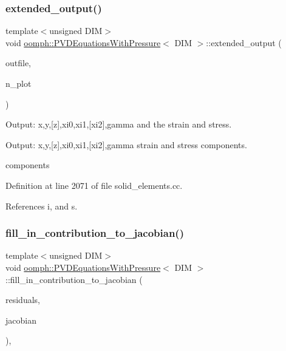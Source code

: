 \subsubsection{\texorpdfstring{extended\+\_\+output()}{extended\_output()}}
{\footnotesize\ttfamily template$<$unsigned D\+IM$>$ \\
void \hyperlink{classoomph_1_1PVDEquationsWithPressure}{oomph\+::\+P\+V\+D\+Equations\+With\+Pressure}$<$ D\+IM $>$\+::extended\+\_\+output (\begin{DoxyParamCaption}\item[{std\+::ostream \&}]{outfile,  }\item[{const unsigned \&}]{n\+\_\+plot }\end{DoxyParamCaption})}



Output\+: x,y,\mbox{[}z\mbox{]},xi0,xi1,\mbox{[}xi2\mbox{]},gamma and the strain and stress. 

Output\+: x,y,\mbox{[}z\mbox{]},xi0,xi1,\mbox{[}xi2\mbox{]},gamma strain and stress components.

components 

Definition at line 2071 of file solid\+\_\+elements.\+cc.



References i, and s.

\mbox{\label{classoomph_1_1PVDEquationsWithPressure_ac1d61d6c3be895e5d033cfbcbfc8bd71}} 
\subsubsection{\texorpdfstring{fill\+\_\+in\+\_\+contribution\+\_\+to\+\_\+jacobian()}{fill\_in\_contribution\_to\_jacobian()}}
{\footnotesize\ttfamily template$<$unsigned D\+IM$>$ \\
void \hyperlink{classoomph_1_1PVDEquationsWithPressure}{oomph\+::\+P\+V\+D\+Equations\+With\+Pressure}$<$ D\+IM $>$\+::fill\+\_\+in\+\_\+contribution\+\_\+to\+\_\+jacobian (\begin{DoxyParamCaption}\item[{\hyperlink{classoomph_1_1Vector}{Vector}$<$ double $>$ \&}]{residuals,  }\item[{\hyperlink{classoomph_1_1DenseMatrix}{Dense\+Matrix}$<$ double $>$ \&}]{jacobian }\end{DoxyParamCaption})\hspace{0.3cm}{\ttfamily [inline]}, {\ttfamily [virtual]}}



